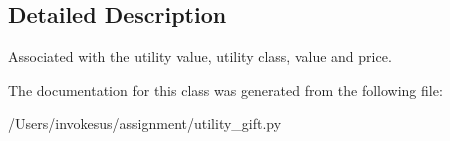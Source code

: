 \subsection{Detailed Description}
\begin{DoxyVerb}Associated with the utility value, utility class, value and price. 
\end{DoxyVerb}
 

The documentation for this class was generated from the following file\+:\begin{DoxyCompactItemize}
\item 
/\+Users/invokesus/assignment/utility\+\_\+gift.\+py\end{DoxyCompactItemize}

